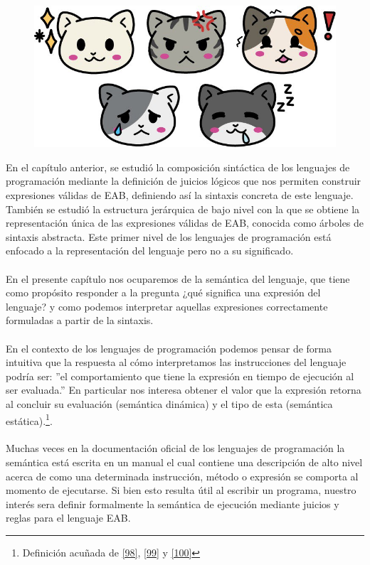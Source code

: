 
\begin{figure}[htbp]
    \centerline{\includegraphics[scale=.4]{assets/04_gatito_semantica.jpg}}       
\end{figure}


\bigskip
\bigskip
\bigskip
\bigskip


    En el capítulo anterior, se estudió la composición sintáctica de los lenguajes de programación mediante la definición de juicios lógicos que nos permiten construir expresiones válidas de \textsf{EAB}, definiendo así la sintaxis 
    concreta de este lenguaje. También se estudió la estructura jerárquica de bajo nivel con la que se obtiene la representación única de las expresiones válidas de \textsf{EAB}, conocida como árboles de sintaxis abstracta. Este primer nivel de los lenguajes de programación está enfocado a la representación del lenguaje pero no a su significado.\\\\
    En el presente capítulo nos ocuparemos de la semántica del lenguaje, que tiene como propósito responder a la pregunta ¿qué significa una expresión del lenguaje? y como podemos interpretar aquellas expresiones correctamente formuladas a partir de la sintaxis.\\\\
    En el contexto de los lenguajes de programación podemos pensar de forma intuitiva que la respuesta al cómo interpretamos las instrucciones del lenguaje podría ser: ''el comportamiento que tiene la expresión en tiempo de ejecución al ser evaluada.'' 
    En particular  nos interesa obtener el valor que la expresión retorna al concluir su evaluación (semántica dinámica) y el tipo de esta (semántica estática).\footnote{Definición acuñada de \hyperlink{98}{[98]}, \hyperlink{99}{[99]} y \hyperlink{100}{[100]}}.\\\\
    Muchas veces en la documentación oficial de los lenguajes de programación la semántica está escrita en un manual el cual contiene una descripción de alto nivel
    acerca de como una determinada instrucción, método o expresión se comporta al momento de ejecutarse. Si bien esto resulta útil al escribir un programa, nuestro interés sera definir formalmente la semántica de ejecución mediante juicios y reglas para el lenguaje \textsf{EAB}. \\


